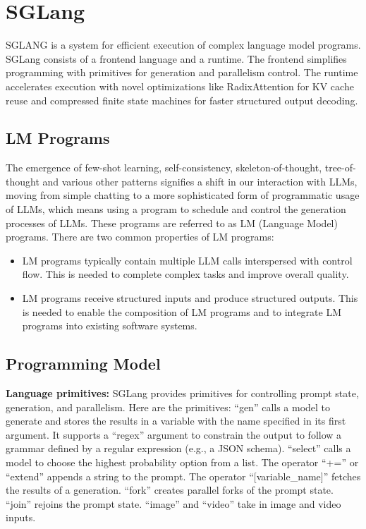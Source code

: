 \chapter{SGLang}
\label{ch:sglang}
SGLANG \cite{zheng2024sglangefficientexecutionstructured} is a system for efficient execution of complex language model programs. SGLang consists of a frontend language and a runtime. The frontend simplifies programming with primitives for generation and parallelism control. The runtime accelerates execution with novel optimizations like RadixAttention for KV cache reuse and compressed finite state machines for faster structured output decoding.

\section{LM Programs}
The emergence of few-shot learning, self-consistency, skeleton-of-thought, tree-of-thought and various other patterns signifies a shift in our interaction with LLMs, moving from simple chatting to a more sophisticated form of programmatic usage of LLMs, which means using a program to schedule and control the generation processes of LLMs. These programs are referred to as LM (Language Model) programs. There are two common properties of LM programs: 
\begin{itemize}
    \item LM programs typically contain multiple LLM calls interspersed with control flow. This is needed to complete complex tasks and improve overall quality.
    \item LM programs receive structured inputs and produce structured outputs. This is needed to enable the composition of LM programs and to integrate LM programs into existing software systems.
\end{itemize}


\section{Programming Model}

\textbf{Language primitives:} SGLang provides primitives for controlling prompt state, generation, and parallelism. Here are the primitives: ``gen'' calls a model to generate and stores the results in a variable with the name specified in its first argument. It supports a ``regex'' argument to constrain the output to follow a grammar defined by a regular expression (e.g., a JSON schema). ``select'' calls a model to choose the highest probability option from a list.  The operator ``+='' or  ``extend'' appends a string to the prompt. The operator ``[variable\_name]'' fetches the results of a generation. ``fork'' creates parallel forks of the prompt state. ``join'' rejoins the prompt state. ``image'' and ``video'' take in image and video inputs.

